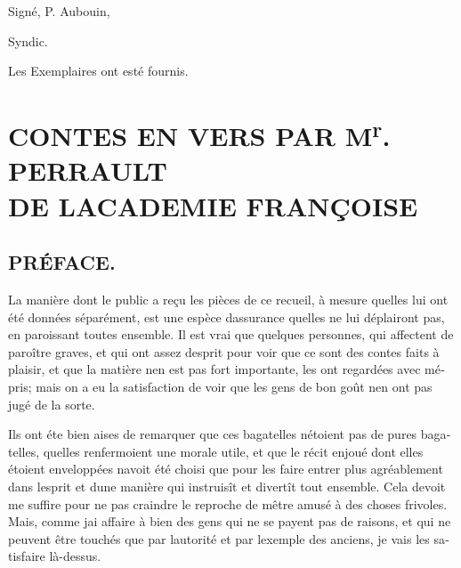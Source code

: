 \documentclass[14pt,a4paper]{memoir}
\begin{document}
\begin{otherlanguage}{french}
\begin{itshape}
\begin{flushright}
Signé, {P. Aubouin},

Syndic.

Les Exemplaires ont esté fournis.
\end{flushright}
\end{itshape}

\part[CONTES EN VERS PAR M\textsuperscript{{r}}. PIERRAULT]{CONTES EN VERS PAR M\textsuperscript{{r}}. PERRAULT\\ [1ex] \large DE L\textquotesingle ACADEMIE FRANÇOISE}

\chapter{PRÉFACE.}
La manière dont le public a reçu les pièces de ce recueil, à mesure
qu\textquotesingle elles lui ont été données séparément, est une espèce
d\textquotesingle assurance qu\textquotesingle elles ne lui déplairont
pas, en paroissant toutes ensemble. Il est vrai que quelques personnes,
qui affectent de paroître graves, et qui ont assez
d\textquotesingle esprit pour voir que ce sont des contes faits à
plaisir, et que la matière n\textquotesingle en est pas fort importante,
les ont regardées avec mépris; mais on a eu la satisfaction de voir que
les gens de bon goût n\textquotesingle en ont pas jugé de la sorte.

Ils ont éte bien aises de remarquer que ces bagatelles
n\textquotesingle étoient pas de pures bagatelles,
qu\textquotesingle elles renfermoient une morale utile, et que le récit
enjoué dont elles étoient enveloppées n\textquotesingle avoit été choisi
que pour les faire entrer plus agréablement dans
l\textquotesingle esprit et d\textquotesingle une manière qui instruisît
et divertît tout ensemble. Cela devoit me suffire pour ne pas craindre
le reproche de m\textquotesingle être amusé à des choses frivoles. Mais,
comme j\textquotesingle ai affaire à bien des gens qui ne se payent pas
de raisons, et qui ne peuvent être touchés que par
l\textquotesingle autorité et par l\textquotesingle exemple des anciens,
je vais les satisfaire là-dessus.


\end{otherlanguage}
\end{document}
